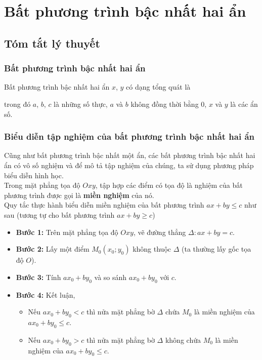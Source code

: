 \section{Bất phương trình bậc nhất hai ẩn}
\setcounter{dang}{0}
\subsection{Tóm tắt lý thuyết}
\subsubsection{Bất phương trình bậc nhất hai ẩn}
Bất phương trình bậc nhất hai ẩn $x$, $y$ có dạng tổng quát là 
\begin{center}
\end{center}
trong đó $a$, $b$, $c$ là những số thực, $a$ và $b$ không đồng thời bằng $0$, $x$ và $y$ là các ẩn số.

\subsubsection{Biểu diễn tập nghiệm của bất phương trình bậc nhất hai ẩn}
Cũng như bất phương trình bậc nhất một ẩn, các bất phương trình bậc nhất hai ẩn có vô số nghiệm và để mô tả tập nghiệm của chúng, ta sử dụng phương pháp biểu diễn hình học.\\ 
Trong mặt phẳng tọa độ $Oxy$, tập hợp các điểm có tọa độ là nghiệm của bất phương trình được gọi là \textbf{miền nghiệm} của nó.\\
Quy tắc thực hành biểu diễn miền nghiệm của bất phương trình $ax+by \le c$ như sau (tương tự cho bất phương trình $ax+by\ge c$)
\begin{itemize}
	\item{\bf Bước 1:} Trên mặt phẳng tọa độ $Oxy$, vẽ đường thẳng $\Delta \colon ax+by=c$.
	\item{\bf Bước 2:} Lấy một điểm $M_0\left(x_0;y_0\right)$ không thuộc $\Delta$ (ta thường lấy gốc tọa độ $O$).
	\item{\bf Bước 3:} Tính $ax_0+by_0$ và so sánh $ax_0+by_0$ với $c$.
	\item{\bf Bước 4:} Kết luận,
	\begin{itemize}
		\item Nếu $ax_0+by_0<c$ thì nửa mặt phẳng bờ $\Delta$ chứa $M_0$ là miền nghiệm của $ax_0+by_0\leq c$.
		\item Nếu $ax_0+by_0>c$ thì nửa mặt phẳng bờ $\Delta$ không chứa $M_0$ là miền nghiệm của $ax_0+by_0\le c$.
	\end{itemize}
\end{itemize}

